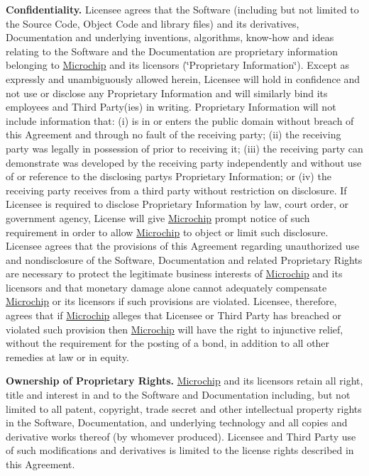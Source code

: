 \begin{DoxyEnumerate}
\item {\bfseries Confidentiality.} Licensee agrees that the Software (including but not limited to the Source Code, Object Code and library files) and its derivatives, Documentation and underlying inventions, algorithms, know-\/how and ideas relating to the Software and the Documentation are proprietary information belonging to \hyperlink{namespace_microchip}{Microchip} and its licensors (\char`\"{}\+Proprietary Information\char`\"{}). Except as expressly and unambiguously allowed herein, Licensee will hold in confidence and not use or disclose any Proprietary Information and will similarly bind its employees and Third Party(ies) in writing. Proprietary Information will not include information that\+: (i) is in or enters the public domain without breach of this Agreement and through no fault of the receiving party; (ii) the receiving party was legally in possession of prior to receiving it; (iii) the receiving party can demonstrate was developed by the receiving party independently and without use of or reference to the disclosing party\textquotesingle{}s Proprietary Information; or (iv) the receiving party receives from a third party without restriction on disclosure. If Licensee is required to disclose Proprietary Information by law, court order, or government agency, License will give \hyperlink{namespace_microchip}{Microchip} prompt notice of such requirement in order to allow \hyperlink{namespace_microchip}{Microchip} to object or limit such disclosure. Licensee agrees that the provisions of this Agreement regarding unauthorized use and nondisclosure of the Software, Documentation and related Proprietary Rights are necessary to protect the legitimate business interests of \hyperlink{namespace_microchip}{Microchip} and its licensors and that monetary damage alone cannot adequately compensate \hyperlink{namespace_microchip}{Microchip} or its licensors if such provisions are violated. Licensee, therefore, agrees that if \hyperlink{namespace_microchip}{Microchip} alleges that Licensee or Third Party has breached or violated such provision then \hyperlink{namespace_microchip}{Microchip} will have the right to injunctive relief, without the requirement for the posting of a bond, in addition to all other remedies at law or in equity.


\item {\bfseries Ownership of Proprietary Rights.} \hyperlink{namespace_microchip}{Microchip} and its licensors retain all right, title and interest in and to the Software and Documentation including, but not limited to all patent, copyright, trade secret and other intellectual property rights in the Software, Documentation, and underlying technology and all copies and derivative works thereof (by whomever produced). Licensee and Third Party use of such modifications and derivatives is limited to the license rights described in this Agreement.



\end{DoxyEnumerate}
